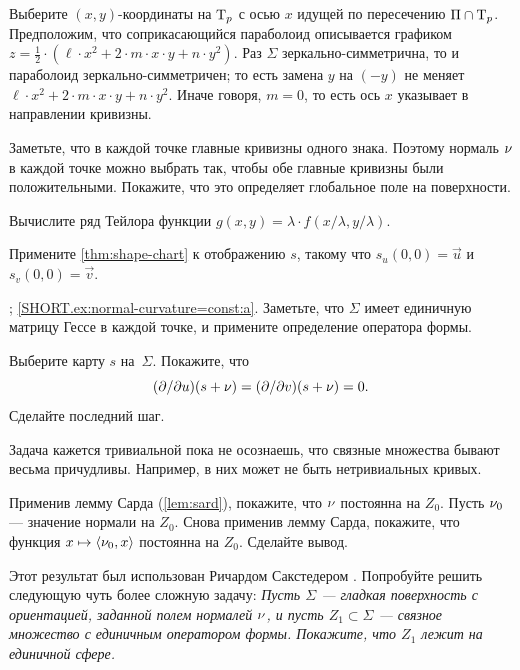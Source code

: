 Выберите $(x,y)$-координаты на $\mathrm{T}_p$ с осью $x$ идущей по пересечению $\Pi\cap \mathrm{T}_p$.
Предположим, что соприкасающийся параболоид описывается графиком 
$z=\tfrac12\cdot(\ell\cdot x^2+2\cdot m\cdot x\cdot y+n\cdot y^2)$.
Раз $\Sigma$ зеркально-симметрична, то и параболоид зеркально-симметричен;
то есть замена $y$ на $(-y)$ не меняет 
$\ell\cdot x^2+2\cdot m\cdot x\cdot y+n\cdot y^2$.
Иначе говоря, $m=0$, то есть ось $x$ указывает в направлении кривизны.

Заметьте, что в каждой точке главные кривизны одного знака.
Поэтому нормаль $\nu$ в каждой точке можно выбрать так, чтобы обе главные кривизны были положительными.
Покажите, что это определяет глобальное поле на поверхности.

Вычислите ряд Тейлора функции $g(x,y)= \lambda \cdot f( x/ \lambda , y/\lambda)$.

Примените \ref{thm:shape-chart} к отображению $s$, такому что $s_u(0,0)=\vec u$ и $s_v(0,0)=\vec v$.

\parbf{\ref{ex:normal-curvature=const}}; \ref{SHORT.ex:normal-curvature=const:a}.
Заметьте, что $\Sigma$ имеет единичную матрицу Гессе в каждой точке, и примените определение оператора формы.

Выберите карту $s$ на~$\Sigma$.
Покажите, что
\[(\partial /\partial u)(s+\nu)
=
(\partial /\partial v)(s+\nu)
=
0.\]
Сделайте последний шаг.

Задача кажется тривиальной пока не осознаешь, что связные множества бывают весьма причудливы.
Например, в них может не быть нетривиальных кривых.

\medskip

Применив лемму Сарда (\ref{lem:sard}), покажите, что $\nu$ постоянна на $Z_0$.
Пусть $\nu_0$ --- значение нормали на $Z_0$.
Снова применив лемму Сарда, покажите, что функция $x\mapsto \langle \nu_0,x\rangle$ постоянна на $Z_0$.
Сделайте вывод.

Этот результат был использован Ричардом Сакстедером \cite[Lemma 6]{sacksteder}.  
Попробуйте решить следующую чуть более сложную задачу:  
\textit{Пусть $\Sigma$ --- гладкая поверхность с ориентацией, заданной полем нормалей $\nu$, и пусть $Z_1\subset \Sigma$ --- связное множество с единичным оператором формы.  
Покажите, что $Z_1$ лежит на единичной сфере.}


